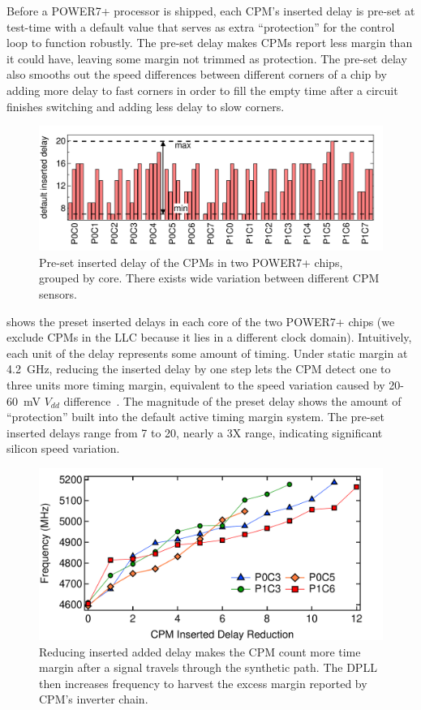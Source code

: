 Before a POWER7+ processor is shipped, each CPM's inserted delay is pre-set at test-time with a default value that serves as extra ``protection'' for the control loop to function robustly. The pre-set delay makes CPMs report less margin than it could have, leaving some margin not trimmed as protection. The pre-set delay also smooths out the speed differences between different corners of a chip by adding more delay to fast corners in order to fill the empty time after a circuit finishes switching and adding less delay to slow corners.

\begin{figure}[t]
  \centering
  \includegraphics[trim=0 0 0 0,clip,width=0.95\linewidth]{graphs/process/default-cpm.pdf}
  \captionsetup{width=.95\linewidth}
  \caption{Pre-set inserted delay of the CPMs in two POWER7+ chips, grouped by core. There exists wide variation between different CPM sensors.}
  \label{fig:default-cpm}
\end{figure}

 shows the preset inserted delays in each core of the two POWER7+ chips (we exclude CPMs in the LLC because it lies in a different clock domain). Intuitively, each unit of the delay represents some amount of timing. Under static margin at 4.2~GHz, reducing the inserted delay by one step lets the CPM detect one to three units more timing margin, equivalent to the speed variation caused by 20-60~mV $V_{dd}$ difference~\cite{drake2013single,zu2015adaptive}. The magnitude of the preset delay shows the amount of ``protection'' built into the default active timing margin system. The pre-set inserted delays range from 7 to 20, nearly a 3X range, indicating significant silicon speed variation.

\begin{figure}[t!]
  \centering
  \includegraphics[trim=0 0 0 0,clip,width=0.8\linewidth]{graphs/process/delay-freq.pdf}
  \caption{Reducing inserted added delay makes the CPM count more time margin after a signal travels through the synthetic path. The DPLL then increases frequency to harvest the excess margin reported by CPM's inverter chain.}
  \label{fig:delay-freq}
\end{figure}


